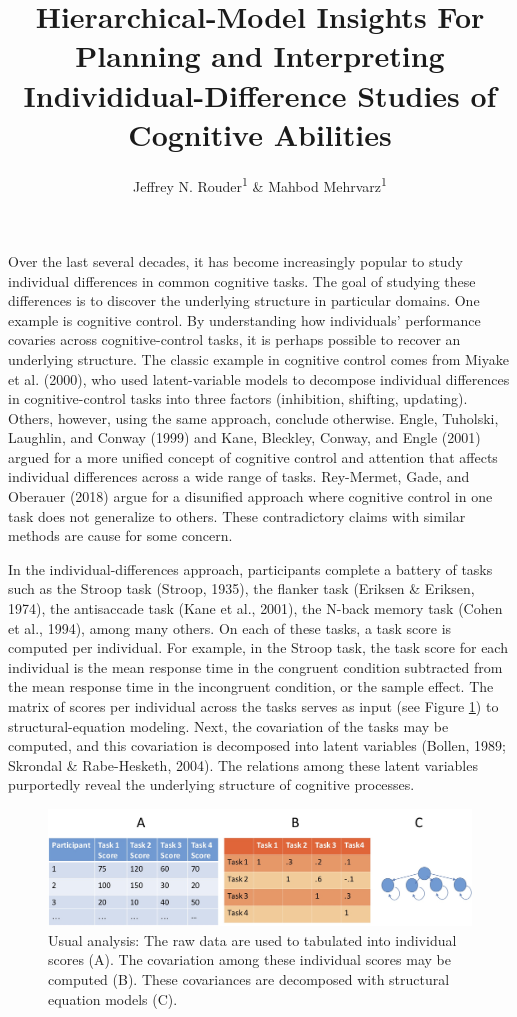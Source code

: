 \documentclass[
  ,man]{apa6}
\title{Hierarchical-Model Insights For Planning and Interpreting Individidual-Difference Studies of Cognitive Abilities}
\author{Jeffrey N. Rouder\textsuperscript{1} \& Mahbod Mehrvarz\textsuperscript{1}}
\date{}
\affiliation{\vspace{0.5cm}\textsuperscript{1} University of California, Irvine}
\begin{document}
\maketitle

Over the last several decades, it has become increasingly popular to study individual differences in common cognitive tasks. The goal of studying these differences is to discover the underlying structure in particular domains. One example is cognitive control. By understanding how individuals' performance covaries across cognitive-control tasks, it is perhaps possible to recover an underlying structure. The classic example in cognitive control comes from Miyake et al. (2000), who used latent-variable models to decompose individual differences in cognitive-control tasks into three factors (inhibition, shifting, updating). Others, however, using the same approach, conclude otherwise. Engle, Tuholski, Laughlin, and Conway (1999) and Kane, Bleckley, Conway, and Engle (2001) argued for a more unified concept of cognitive control and attention that affects individual differences across a wide range of tasks. Rey-Mermet, Gade, and Oberauer (2018) argue for a disunified approach where cognitive control in one task does not generalize to others. These contradictory claims with similar methods are cause for some concern.

In the individual-differences approach, participants complete a battery of tasks such as the Stroop task (Stroop, 1935), the flanker task (Eriksen \& Eriksen, 1974), the antisaccade task (Kane et al., 2001), the N-back memory task (Cohen et al., 1994), among many others. On each of these tasks, a task score is computed per individual. For example, in the Stroop task, the task score for each individual is the mean response time in the congruent condition subtracted from the mean response time in the incongruent condition, or the sample effect. The matrix of scores per individual across the tasks serves as input (see Figure \ref{fig:usual}) to structural-equation modeling. Next, the covariation of the tasks may be computed, and this covariation is decomposed into latent variables (Bollen, 1989; Skrondal \& Rabe-Hesketh, 2004). The relations among these latent variables purportedly reveal the underlying structure of cognitive processes.

\begin{figure}
\includegraphics[width=5in]{dataAnalysis} \caption{Usual analysis: The raw data are used to tabulated into individual scores (A). The covariation among these individual scores may be computed (B).  These covariances are decomposed with structural equation models (C).}\label{fig:usual}
\end{figure}
\end{document}
